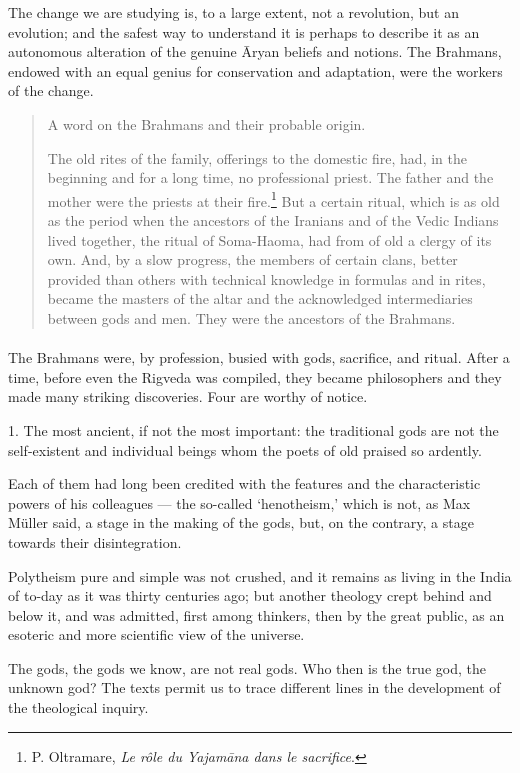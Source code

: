 \documentclass[a4paper, 11pt, oneside, english, landscape]{article}
\begin{document}
The change we are studying is, to a large extent, not a revolution, but an evolution; and the safest way to understand it is perhaps to describe it as an autonomous alteration of the genuine Āryan beliefs and notions. The Brahmans, endowed with an equal genius for conservation and adaptation, were the workers of the change.
\begin{quotation}
\small
A word on the Brahmans and their probable origin.

The old rites of the family, offerings to the domestic fire, had, in the beginning and for a long time, no professional priest. The father and the mother were the priests at their fire.\footnote{P. Oltramare, \emph{Le rôle du Yajamāna dans le sacrifice}.} But a certain ritual, which is as old as the period when the ancestors of the Iranians and of the Vedic Indians lived together, the ritual of Soma-Haoma, had from of old a clergy of its own. And, by a slow progress, the members of certain clans, better provided than others with technical knowledge in formulas and in rites, became the masters of the altar and the acknowledged intermediaries between gods and men. They were the ancestors of the Brahmans.
\end{quotation}
\paragraph{}
The Brahmans were, by profession, busied with gods, sacrifice, and ritual. After a time, before even the Rigveda was compiled, they became philosophers and they made many striking discoveries. Four are worthy of notice.

1. The most ancient, if not the most important: the traditional gods are not the self-existent and individual beings whom the poets of old praised so ardently.

Each of them had long been credited with the features and the characteristic powers of his colleagues --- the so-called `henotheism,' which is not, as Max Müller said, a stage in the making of the gods, but, on the contrary, a stage towards their disintegration.

Polytheism pure and simple was not crushed, and it remains as living in the India of to-day as it was thirty centuries ago; but another theology crept behind and below it, and was admitted, first among thinkers, then by the great public, as an esoteric and more scientific view of the universe.

The gods, the gods we know, are not real gods. Who then is the true god, the unknown god? The texts permit us to trace different lines in the development of the theological inquiry.
\end{document}
